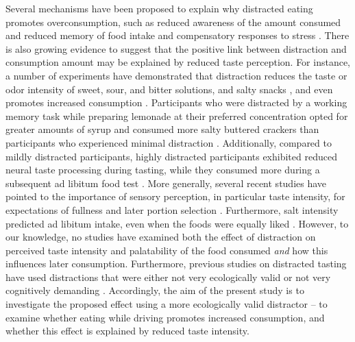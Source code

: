\documentclass[authordate, empirical, issue]{jote-new-article}
\begin{document}
Several mechanisms have been proposed to explain why distracted eating promotes overconsumption, such as reduced awareness of the amount consumed and reduced memory of food intake \parencites{Robinson2013}{Oldham-Cooper2010} and compensatory responses to stress \parencites{Reichenberger2018}{Torres2007}. There is also growing evidence to suggest that the positive link between distraction and consumption amount may be explained by reduced taste perception. For instance, a number of experiments have demonstrated that distraction reduces the taste or odor intensity of sweet, sour, and bitter solutions, and salty snacks \parencites{Hoffmann-Hensel2017}{Liang2018}{Wal2013}, and even promotes increased consumption \parencites{Morris2020}{Wal2013}. Participants who were distracted by a working memory task while preparing lemonade at their preferred concentration opted for greater amounts of syrup and consumed more salty buttered crackers than participants who experienced minimal distraction \parencites{Wal2013}. Additionally, compared to mildly distracted participants, highly distracted participants exhibited reduced neural taste processing during tasting, while they consumed more during a subsequent ad libitum food test \parencites{Duif2020}. More generally, several recent studies have pointed to the importance of sensory perception, in particular taste intensity, for expectations of fullness and later portion selection \parencites[as reviewed in][]{Forde2018}. Furthermore, salt intensity predicted ad libitum intake, even when the foods were equally liked \parencites{Bolhuis2012}. However, to our knowledge, no studies have examined both the effect of distraction on perceived taste intensity and palatability of the food consumed \emph{and} how this influences later consumption. Furthermore, previous studies on distracted tasting have used distractions that were either not very ecologically valid \parencites[e.g. working memory task][]{Wal2013}{Duif2020}{Liang2018} or not very cognitively demanding \parencites[e.g. listening to music,][]{Stroebele2006}. Accordingly, the aim of the present study is to investigate the proposed effect using a more ecologically valid distractor – to examine whether eating while driving promotes increased consumption, and whether this effect is explained by reduced taste intensity.
\end{document}
